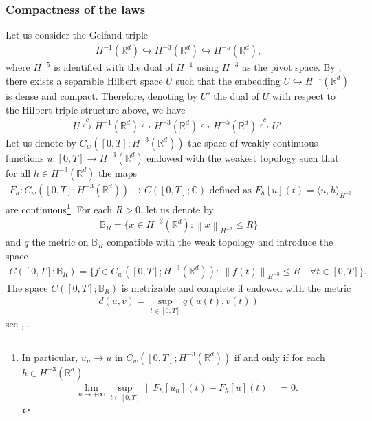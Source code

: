 \documentclass[a4paper,10pt]{amsart}
\newcommand{\R}{\mathbb{R}}
\newcommand{\norm}[1]{\left\|#1\right\|}
\theoremstyle{remark}
\numberwithin{equation}{section}
\begin{document}
\subsubsection{Compactness of the laws}\label{subsec:compactness_fluct}
Let us consider the Gelfand triple
\begin{align*}
    H^{-1}(\R^d)\hookrightarrow H^{-3}(\R^d)\hookrightarrow H^{-5}(\R^d),
\end{align*}
where $H^{-5}$ is identified with the dual of $H^{-1}$ using $H^{-3}$ as
the pivot space.
By \cite[Lemma C.1]{brzezniak2013existence}, there exists a separable Hilbert space $U$ such that the embedding $U\hookrightarrow H^{-1}(\R^d)$ is dense and compact. Therefore, denoting by $U'$ the dual of $U$ with respect to the Hilbert triple structure above, we have
\begin{align*}
    U\stackrel{c}{\hookrightarrow} H^{-1}(\R^d)\hookrightarrow H^{-3}(\R^d)\hookrightarrow H^{-5}(\R^d)\stackrel{c}{\hookrightarrow} U'.
\end{align*}
Let us denote by $C_w([0,T];H^{-3}(\R^d))$ the space of weakly continuous functions $u:[0,T]\rightarrow H^{-3}(\R^d) $ endowed with the weakest topology such that for all $h\in H^{-3}(\R^d)$ the maps
\begin{align*}
    F_h:C_w([0,T];H^{-3}(\R^d))\rightarrow C([0,T];\mathbb{C})\mbox{ defined as } F_h[u](t)=\langle u,h\rangle_{H^{-3}} 
\end{align*}
are continuous\footnote{In particular, $u_n\rightarrow u $ in $C_w([0,T];H^{-3}(\R^d))$ if and only if for each $h\in H^{-3}(\R^d)$
\begin{align*}
    \lim_{n\rightarrow +\infty}\sup_{t\in [0,T]}\|F_h[u_n](t)-F_h[u](t)\|=0.
\end{align*}}. For each $R>0$, let us denote by \begin{align*}
    \mathbb{B}_R=\{x\in H^{-3}(\R^d): \norm{x}_{H^{-3}}\leq R\}
\end{align*}
and $q$ the metric on $\mathbb{B}_R$ compatible with the weak topology and introduce the space
\begin{align*}
    C([0,T];\mathbb{B}_R)=\{f\in C_w([0,T];H^{-3}(\R^d)):\ \norm{f(t)}_{H^{-3}}\leq R\quad \forall t\in [0,T]\}.
\end{align*}
The space $C([0,T];\mathbb{B}_R)$ is metrizable and complete if endowed with the metric
\begin{align*}
d(u,v)=\sup_{t\in [0,T]}q(u(t),v(t))    
\end{align*}
see \cite{Brez_book_f}, 
\cite{brzezniak2013existence}.
\end{document}
